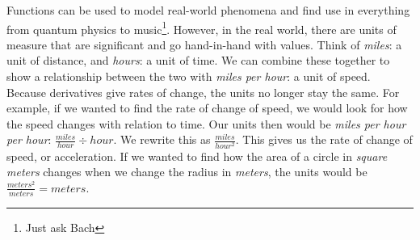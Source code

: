 \documentclass[../revisedmain.tex]{subfiles}
\begin{document}
	Functions can be used to model real-world phenomena and find use in everything from quantum physics to music\footnote{Just ask Bach}. However, in the real world, there are units of measure that are significant and go hand-in-hand with values. Think of \textit{miles}: a unit of distance, and \textit{hours}: a unit of time. We can combine these together to show a relationship between the two with \textit{miles per hour}: a  unit of speed. Because derivatives give rates of change, the units no longer stay the same. For example, if we wanted to find the rate of change of speed, we would look for how the speed changes with relation to time. Our units then would be \textit{miles per hour per hour}: $\displaystyle\frac{miles}{hour}\div hour$. We rewrite this as $\displaystyle\frac{miles}{hour^2}$. This gives us the rate of change of speed, or acceleration. If we wanted to find how the area of a circle in \textit{square meters} changes when we change the radius in \textit{meters}, the units would be $\displaystyle\frac{meters^2}{meters} = meters$.
\end{document}
